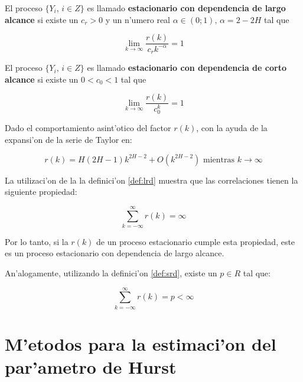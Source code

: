 \begin{definicion} \label{def:lrd}
El proceso $\{Y_i \text{,  } i \in Z \}$ es llamado {\bf estacionario con
dependencia de largo alcance} si existe un $c_r > 0$ y un n'umero real
$\alpha \in (0;1) \text{,  } \alpha = 2 - 2H$ tal que

\begin{equation} \label{eq:lrd}
\lim_{k \to \infty} \frac{r(k)}{c_rk^{-\alpha}} = 1
\end{equation}
\end{definicion}

\begin{definicion} \label{def:srd}
El proceso $\{Y_i \text{,  } i \in Z \}$ es llamado {\bf estacionario con
dependencia de corto alcance} si existe un $0 < c_0 < 1$ tal que

\begin{equation} \label{eq:srd}
\lim_{k \to \infty} \frac{r(k)}{c_0^k} = 1
\end{equation}
\end{definicion}

Dado el comportamiento asint'otico del factor $r(k)$, con la ayuda de la
expansi'on de la serie de Taylor en:

\begin{equation}
r(k) = H (2H-1)k^{2H-2} + O(k^{2H-2}) \text{ mientras  } k \to \infty
\end{equation}

La utilizaci'on de la la definici'on \ref{def:lrd} muestra que las
correlaciones tienen la siguiente propiedad:

\begin{equation}
\sum_{k = -\infty}^{\infty}{r(k)} = \infty
\end{equation}

Por lo tanto, si la $r(k)$ de un proceso estacionario cumple esta propiedad,
este es un proceso estacionario con dependencia de largo alcance.

An'alogamente, utilizando la definici'on \ref{def:srd}, existe un $p \in R$
tal que:

\begin{equation}
\sum_{k = -\infty}^{\infty}{r(k)} = p < \infty
\end{equation}

\section{M'etodos para la estimaci'on del par'ametro de Hurst}
\label{sect:metodos}

